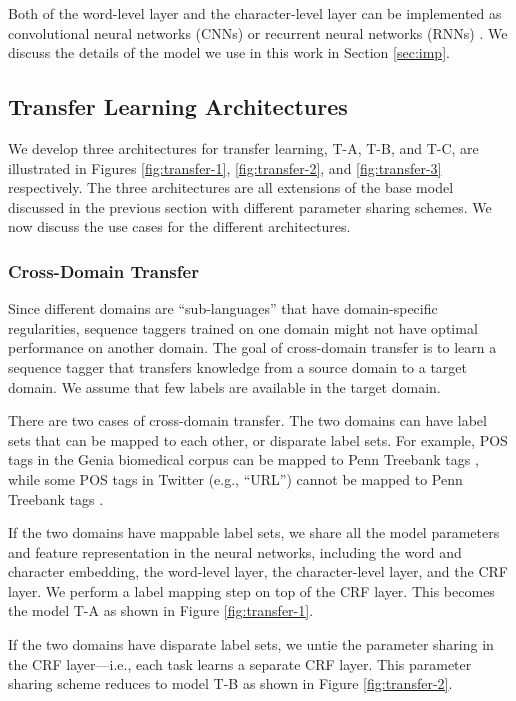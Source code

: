 Both of the word-level layer and the character-level layer can be implemented as convolutional neural networks (CNNs) or recurrent neural networks (RNNs) \citep{collobert2011natural,chiu2015named,lample2016neural,ma2016end}. We discuss the details of the model we use in this work in Section \ref{sec:imp}.

\subsection{Transfer Learning Architectures}

We develop three architectures for transfer learning, T-A, T-B, and T-C, are illustrated in Figures \ref{fig:transfer-1}, \ref{fig:transfer-2}, and \ref{fig:transfer-3} respectively. The three architectures are all extensions of the base model discussed in the previous section with different parameter sharing schemes. We now discuss the use cases for the different architectures.

\subsubsection{Cross-Domain Transfer}

Since different domains are ``sub-languages'' that have domain-specific regularities, sequence taggers trained on one domain might not have optimal performance on another domain. The goal of cross-domain transfer is to learn a sequence tagger that transfers knowledge from a source domain to a target domain. We assume that few labels are available in the target domain.

There are two cases of cross-domain transfer. The two domains can have label sets that can be mapped to each other, or disparate label sets. For example, POS tags in the Genia biomedical corpus can be mapped to Penn Treebank tags \citep{barrett2014token}, while some POS tags in Twitter (e.g., ``URL'') cannot be mapped to Penn Treebank tags \citep{ritter2011named}.

If the two domains have mappable label sets, we share all the model parameters and feature representation in the neural networks, including the word and character embedding, the word-level layer, the character-level layer, and the CRF layer. We perform a label mapping step on top of the CRF layer. This becomes the model T-A as shown in Figure \ref{fig:transfer-1}.

If the two domains have disparate label sets, we untie the parameter sharing in the CRF layer---i.e., each task learns a separate CRF layer. This parameter sharing scheme reduces to model T-B as shown in Figure \ref{fig:transfer-2}.

